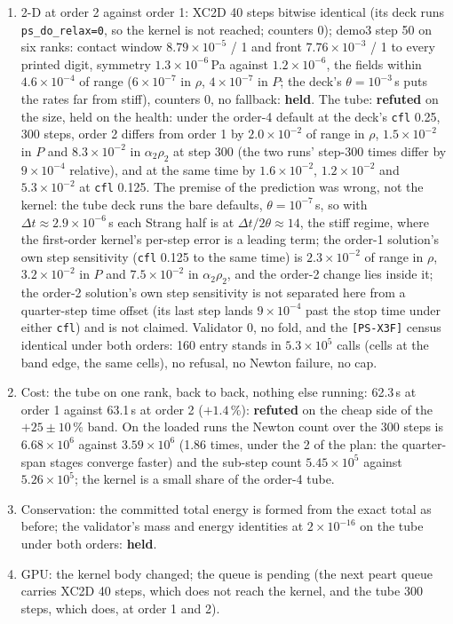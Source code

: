 \documentclass[11pt,a4paper]{article}
\newcommand{\code}[1]{\texttt{\small #1}}
\newcommand{\Dt}{\Delta t}
\begin{document}
\begin{enumerate}[nosep]
      0.0299 both: \textbf{held}, and on the first build it was not,
      which is the finding below.
\item 2-D at order 2 against order 1: XC2D 40 steps bitwise identical
      (its deck runs \code{ps\_do\_relax=0}, so the kernel is not
      reached; counters 0); demo3 step 50 on six ranks: contact window
      $8.79\times10^{-5}$ / 1 and front $7.76\times10^{-3}$ / 1 to every
      printed digit, symmetry $1.3\times10^{-6}$\,Pa against
      $1.2\times10^{-6}$, the fields within $4.6\times10^{-4}$ of range
      ($6\times10^{-7}$ in $\rho$, $4\times10^{-7}$ in $P$; the deck's
      $\theta = 10^{-3}$\,s puts the rates far from stiff), counters 0,
      no fallback: \textbf{held}.  The tube: \textbf{refuted} on the
      size, held on the health: under the order-4 default at the deck's \code{cfl} 0.25, 300 steps, order 2 differs from order 1 by $2.0\times10^{-2}$ of range in $\rho$, $1.5\times10^{-2}$ in $P$ and $8.3\times10^{-2}$ in $\alpha_2\rho_2$ at step 300 (the two runs' step-300 times differ by $9\times10^{-4}$ relative), and at the same time by $1.6\times10^{-2}$, $1.2\times10^{-2}$ and $5.3\times10^{-2}$ at \code{cfl} 0.125.  The premise of the
      prediction was wrong, not the kernel: the tube deck runs the
      bare defaults, $\theta = 10^{-7}$\,s, so with $\Dt \approx
      2.9\times10^{-6}$\,s each Strang half is at $\Dt/2\theta \approx
      14$, the stiff regime, where the first-order kernel's per-step
      error is a leading term; the order-1 solution's own step
      sensitivity (\code{cfl} 0.125 to the same time) is
      $2.3\times10^{-2}$ of range in $\rho$, $3.2\times10^{-2}$ in $P$
      and $7.5\times10^{-2}$ in $\alpha_2\rho_2$, and the order-2 change
      lies inside it; the order-2 solution's own step sensitivity is not separated here from a quarter-step time offset (its last step lands $9\times10^{-4}$ past the stop time under either \code{cfl}) and is not claimed.
      Validator 0, no fold, and the \code{[PS-X3F]} census identical under both orders: 160 entry stands in $5.3\times10^{5}$ calls (cells at the band edge, the same cells), no refusal, no Newton failure, no cap.
\item Cost: the tube on one rank, back to back, nothing else running: 62.3\,s at order 1 against 63.1\,s at order 2 ($+1.4\,\%$): \textbf{refuted} on the cheap side of the $+25\pm10\,\%$ band.  On the loaded runs the Newton count over the
      300 steps is $6.68\times10^{6}$ against $3.59\times10^{6}$ (1.86
      times, under the 2 of the plan: the quarter-span stages converge
      faster) and the sub-step count $5.45\times10^{5}$ against
      $5.26\times10^{5}$; the kernel is a small share of the order-4
      tube.
\item Conservation: the committed total energy is formed from the
      exact total as before; the validator's mass and energy identities
      at $2\times10^{-16}$ on the tube under both orders: \textbf{held}.
\item GPU: the kernel body changed; the queue is pending (the next
      peart queue carries XC2D 40 steps, which does not reach the
      kernel, and the tube 300 steps, which does, at order 1 and 2).
\end{enumerate}
\end{document}
